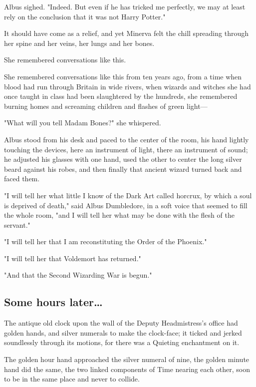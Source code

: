 Albus sighed. "Indeed. But even if he has tricked me perfectly, we may at least 
rely on the conclusion that it was not Harry Potter."

It should have come as a relief, and yet Minerva felt the chill spreading 
through her spine and her veins, her lungs and her bones.

She remembered conversations like this.

She remembered conversations like this from ten years ago, from a time when 
blood had run through Britain in wide rivers, when wizards and witches she had 
once taught in class had been slaughtered by the hundreds, she remembered 
burning homes and screaming children and flashes of green light---

"What will you tell Madam Bones?" she whispered.

Albus stood from his desk and paced to the center of the room, his hand lightly 
touching the devices, here an instrument of light, there an instrument of 
sound; he adjusted his glasses with one hand, used the other to center the long 
silver beard against his robes, and then finally that ancient wizard turned 
back and faced them.

"I will tell her what little I know of the Dark Art called horcrux, by which a 
soul is deprived of death," said Albus Dumbledore, in a soft voice that seemed 
to fill the whole room, "and I will tell her what may be done with the flesh of 
the servant."

"I will tell her that I am reconstituting the Order of the Phoenix."

"I will tell her that Voldemort has returned."

"And that the Second Wizarding War is begun."
\sbreak
\vspace{-2\baselineskip}
\subsection{Some hours later{\ldots}}

The antique old clock upon the wall of the Deputy Headmistress's office had 
golden hands, and silver numerals to make the clock-face; it ticked and jerked 
soundlessly through its motions, for there was a Quieting enchantment on it.

The golden hour hand approached the silver numeral of nine, the golden minute 
hand did the same, the two linked components of Time nearing each other, soon 
to be in the same place and never to collide.

